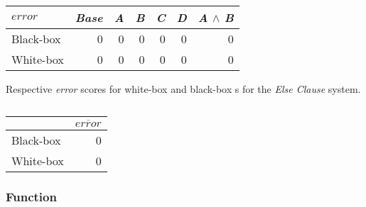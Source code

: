 \begin{table}[H]
    \begin{minipage}{.5\linewidth}
        \centering
        \begin{tabular}{lrrrrrr}    \toprule
        $error$    & \emph{Base} & \emph{A} & \emph{B} & \emph{C} & \emph{D} & \emph{A} $\land$ \emph{B}   \\ \midrule
        Black-box & 0 & 0 & 0 & 0 & 0 & 0      \\
        White-box & 0 & 0 & 0 & 0 & 0 & 0      \\ \bottomrule
        \end{tabular}
        \caption{Respective \emph{error} scores for white-box and black-box {\perfInfluenceModel}s for the \emph{Else Clause} system.}
    \end{minipage}%
    \hspace{7mm}
    \begin{minipage}{.3\linewidth}
        \centering
        \begin{tabular}{lr}
            \toprule
                      & $\overline{error}$   \\ \midrule
            Black-box & 0              \\
            White-box & 0              \\ \bottomrule
            \end{tabular} 
            \caption{}
        \end{minipage}
    \end{table}
    
\subsubsection*{Function}

